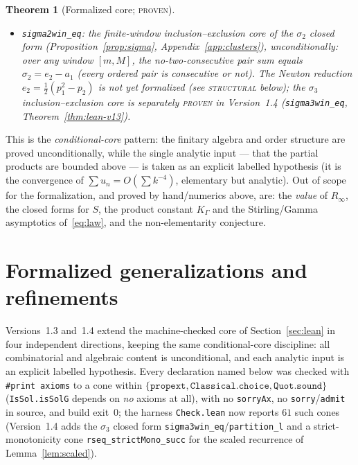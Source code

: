 \documentclass[11pt]{article}
\newtheorem{theorem}{Theorem}
\newcommand{\R}{\mathbb{R}}
\newcommand{\Rinf}{R_\infty}
\begin{document}
\begin{theorem}[Formalized core; \textsc{proven}]
\begin{itemize}
(Proposition~\ref{prop:indpoly}), \emph{unconditionally}. The weighted independence
polynomial of the path graph on $\{2,\dots,n\}$,
$\mathrm{indepPoly}(u,n)=\sum_{T}\prod_{i\in T}u_i$ over no-two-consecutive
$T\subseteq\{2,\dots,n\}$, equals $R_n$; proved by the deletion--contraction split
at the top vertex (over $\R$, no positivity needed).
\item \texttt{sigma2win\_eq}: the finite-window inclusion--exclusion core of the
$\sigma_2$ closed form (Proposition~\ref{prop:sigma}, Appendix~\ref{app:clusters}),
\emph{unconditionally}: over any window $[m,M]$, the no-two-consecutive pair sum
equals $\sigma_2=e_2-a_1$ (every ordered pair is consecutive or not). The Newton
reduction $e_2=\tfrac12(p_1^2-p_2)$ is not yet formalized (see \textsc{structural}
below); the $\sigma_3$ inclusion--exclusion core is separately \textsc{proven} in
Version~1.4 (\texttt{sigma3win\_eq}, Theorem~\ref{thm:lean-v13}).
\end{itemize}
\end{theorem}

This is the \emph{conditional-core} pattern: the finitary algebra and order
structure are proved unconditionally, while the single analytic input --- that the
partial products are bounded above --- is taken as an explicit labelled hypothesis
(it is the convergence of $\sum u_n=O(\sum k^{-4})$, elementary but analytic). Out
of scope for the formalization, and proved by hand/numerics above, are: the
\emph{value} of $\Rinf$, the closed forms for $S$, the
product constant $K_\Gamma$ and the Stirling/Gamma asymptotics of~\eqref{eq:law},
and the non-elementarity conjecture.

\section{Formalized generalizations and refinements}\label{sec:lean-v13}

Versions~1.3 and~1.4 extend the machine-checked core of Section~\ref{sec:lean} in four
independent directions, keeping the same conditional-core discipline: all
combinatorial and algebraic content is unconditional, and each analytic input is an
explicit labelled hypothesis. Every declaration named below was checked with
\texttt{\#print axioms} to a cone within
$\{\texttt{propext},\texttt{Classical.choice},\texttt{Quot.sound}\}$
(\texttt{IsSol.isSolG} depends on \emph{no} axioms at all), with no \texttt{sorryAx},
no \texttt{sorry}/\texttt{admit} in source, and build exit~$0$; the harness
\texttt{Check.lean} now reports $61$ such cones (Version~1.4 adds the $\sigma_3$
closed form \texttt{sigma3win\_eq}/\texttt{partition\_l} and a strict-monotonicity
cone \texttt{rseq\_strictMono\_succ} for the scaled recurrence of
Lemma~\ref{lem:scaled}).
\end{document}
